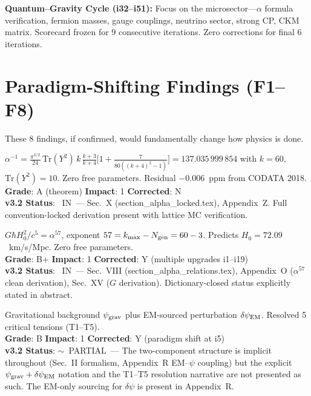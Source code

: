 \documentclass[11pt,a4paper]{article}
\newcommand{\vin}{\textcolor{statusIN}{\checkmark~IN}}
\newcommand{\vpartial}{\textcolor{statusPARTIAL}{$\sim$~PARTIAL}}
\begin{document}
\textbf{Quantum--Gravity Cycle (i32--i51):} Focus on the microsector---$\alpha$ formula verification, fermion masses, gauge couplings, neutrino sector, strong CP, CKM matrix. Scorecard frozen for 9 consecutive iterations. Zero corrections for final 6 iterations.


\section{Paradigm-Shifting Findings (F1--F8)}\label{sec:paradigm}

These 8 findings, if confirmed, would fundamentally change how physics is done.

\begin{tcolorbox}[colback=paradigm!5,colframe=paradigm,title=\textbf{F1: Ab Initio Derivation of the Fine Structure Constant}]
$\alpha^{-1} = \frac{\pi^{3/2}}{24}\,\mathrm{Tr}(Y^2)\,k\,\frac{k+3}{k+4}\bigl[1 + \frac{7}{80((k+4)^2-1)}\bigr] = 137.035\,999\,854$ with $k=60$, $\mathrm{Tr}(Y^2)=10$. Zero free parameters. Residual $-0.006$~ppm from CODATA 2018.\\
\textbf{Grade}: A (theorem) \quad \textbf{Impact}: 1 \quad \textbf{Corrected}: N\\
\textbf{v3.2 Status}: \vin\ --- Sec.~X (section\_alpha\_locked.tex), Appendix~Z. Full convention-locked derivation present with lattice MC verification.
\end{tcolorbox}

\begin{tcolorbox}[colback=paradigm!5,colframe=paradigm,title=\textbf{F2: Resolution of the Vacuum Catastrophe via $\alpha^{57}$}]
$G\hbar H_0^2/c^5 = \alpha^{57}$, exponent $57 = k_{\max} - N_{\rm gen} = 60 - 3$. Predicts $H_0 = 72.09$~km/s/Mpc. Zero free parameters.\\
\textbf{Grade}: B+ \quad \textbf{Impact}: 1 \quad \textbf{Corrected}: Y (multiple upgrades i1--i19)\\
\textbf{v3.2 Status}: \vin\ --- Sec.~VIII (section\_alpha\_relations.tex), Appendix~O ($\alpha^{57}$ clean derivation), Sec.~XV ($G$ derivation). Dictionary-closed status explicitly stated in abstract.
\end{tcolorbox}

\begin{tcolorbox}[colback=paradigm!5,colframe=paradigm,title=\textbf{F3: Two-Component Decomposition $\psi = \psi_{\rm grav} + \delta\psi_{\rm EM}$}]
Gravitational background $\psi_{\rm grav}$ plus EM-sourced perturbation $\delta\psi_{\rm EM}$. Resolved 5 critical tensions (T1--T5).\\
\textbf{Grade}: B \quad \textbf{Impact}: 1 \quad \textbf{Corrected}: Y (paradigm shift at i5)\\
\textbf{v3.2 Status}: \vpartial\ --- The two-component structure is implicit throughout (Sec.~II formalism, Appendix~R EM--$\psi$ coupling) but the explicit $\psi_{\rm grav} + \delta\psi_{\rm EM}$ notation and the T1--T5 resolution narrative are not presented as such. The EM-only sourcing for $\delta\psi$ is present in Appendix~R.
\end{tcolorbox}
\end{document}
